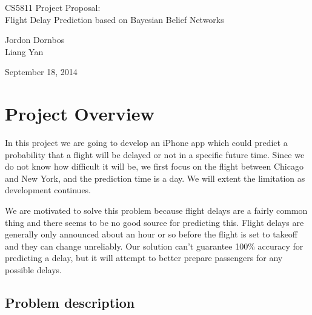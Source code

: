 \documentclass[12pt]{article}
\begin{document}
\begin{center}
{\large CS5811 Project Proposal:}\\
{\large Flight Delay Prediction based on Bayesian Belief Networks}

{\small Jordon Dornbos\\}
{\small Liang Yan\\}

{\small September 18, 2014\\}

\end{center}

\section{Project Overview}

In this project we are going to develop an iPhone app which could
predict a probability that a flight will be delayed or not in a
specific future time. Since we do not know how difficult it will be,
we first focus on the flight between Chicago and New York, and the
prediction time is a day. We will extent the limitation as development 
continues.  
 
We are motivated to solve this problem because flight delays are a
fairly common thing and there seems to be no good source for
predicting this. Flight delays are generally only announced about an
hour or so before the flight is set to takeoff and they can change
unreliably. Our solution can't guarantee 100\% accuracy for predicting
a delay, but it will attempt to better prepare passengers for any
possible delays. 

\subsection{Problem description}
\label{sec:problem-desc}
\end{document}
